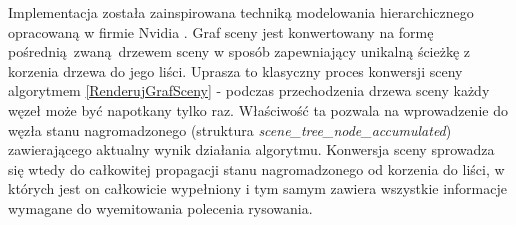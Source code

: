 Implementacja została zainspirowana techniką modelowania hierarchicznego opracowaną w firmie Nvidia \cite{ADVANCEDSCENEGRAPH}.
Graf sceny jest konwertowany na formę pośrednią zwaną drzewem sceny w sposób zapewniający unikalną ścieżkę z korzenia drzewa do jego liści.
Uprasza to klasyczny proces konwersji sceny algorytmem \ref{RenderujGrafSceny} - podczas przechodzenia drzewa sceny każdy węzeł może być napotkany tylko raz.
Właściwość ta pozwala na wprowadzenie do węzła stanu nagromadzonego (struktura \textit{scene\_tree\_node\_accumulated}) zawierającego aktualny wynik działania algorytmu.
Konwersja sceny sprowadza się wtedy do całkowitej propagacji stanu nagromadzonego od korzenia do liści, w których jest on całkowicie wypełniony i tym samym zawiera wszystkie informacje wymagane do wyemitowania polecenia rysowania.


